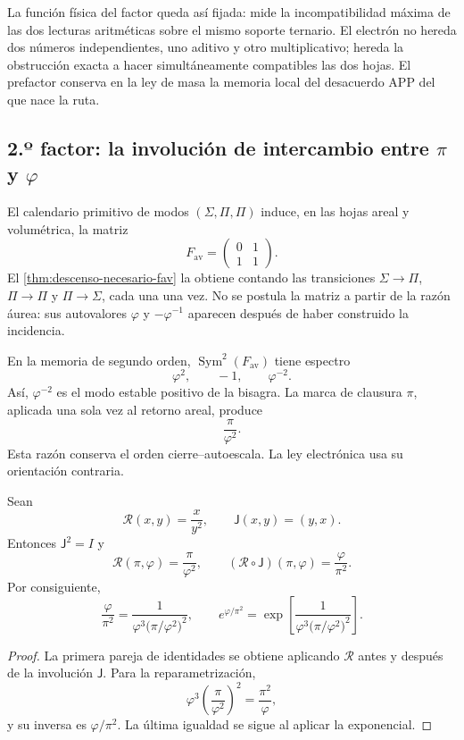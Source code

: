 La función física del factor queda así fijada: mide la incompatibilidad
máxima de las dos lecturas aritméticas sobre el mismo soporte ternario. El
electrón no hereda dos números independientes, uno aditivo y otro
multiplicativo; hereda la obstrucción exacta a hacer simultáneamente
compatibles las dos hojas. El prefactor conserva en la ley de masa la
memoria local del desacuerdo APP del que nace la ruta.

\subsection{2.º factor: la involución de intercambio entre \(\pi\) y \(\varphi\)}

El calendario primitivo de modos
\((\Sigma,\Pi,\Pi)\) induce, en las hojas areal y volumétrica, la matriz
\[
 F_{\mathrm{av}}
 =
 \begin{pmatrix}
 0&1\\
 1&1
 \end{pmatrix}.
\]
El \cref{thm:descenso-necesario-fav} la obtiene contando las transiciones
\(\Sigma\to\Pi\), \(\Pi\to\Pi\) y \(\Pi\to\Sigma\), cada una una vez.
No se postula la matriz a partir de la razón áurea: sus autovalores
\(\varphi\) y \(-\varphi^{-1}\) aparecen después de haber construido la
incidencia.

En la memoria de segundo orden,
\(\operatorname{Sym}^2(F_{\mathrm{av}})\) tiene espectro
\[
 \varphi^2,\qquad -1,\qquad\varphi^{-2}.
\]
Así, \(\varphi^{-2}\) es el modo estable positivo de la bisagra. La marca
de clausura \(\pi\), aplicada una sola vez al retorno areal, produce
\[
 \frac{\pi}{\varphi^2}.
\]
Esta razón conserva el orden cierre--autoescala. La ley electrónica usa su
orientación contraria.

\begin{theorem}
\label{thm:espejo-electron-rev6}
Sean
\[
 \mathscr R(x,y)=\frac{x}{y^2},
 \qquad
 \mathsf J(x,y)=(y,x).
\]
Entonces \(\mathsf J^2=I\) y
\[
 \mathscr R(\pi,\varphi)=\frac{\pi}{\varphi^2},
 \qquad
 (\mathscr R\circ\mathsf J)(\pi,\varphi)
 =\frac{\varphi}{\pi^2}.
\]
Por consiguiente,
\[
 \frac{\varphi}{\pi^2}
 =
 \frac{1}{
 \varphi^3\bigl(\pi/\varphi^2\bigr)^2},
 \qquad
 e^{\varphi/\pi^2}
 =
 \exp\!\left[
 \frac{1}{
 \varphi^3\bigl(\pi/\varphi^2\bigr)^2}
 \right].
\]
\end{theorem}

\begin{proof}
La primera pareja de identidades se obtiene aplicando
\(\mathscr R\) antes y después de la involución \(\mathsf J\). Para la
reparametrización,
\[
 \varphi^3
 \left(\frac{\pi}{\varphi^2}\right)^2
 =\frac{\pi^2}{\varphi},
\]
y su inversa es \(\varphi/\pi^2\). La última igualdad se sigue al aplicar
la exponencial.
\end{proof}

